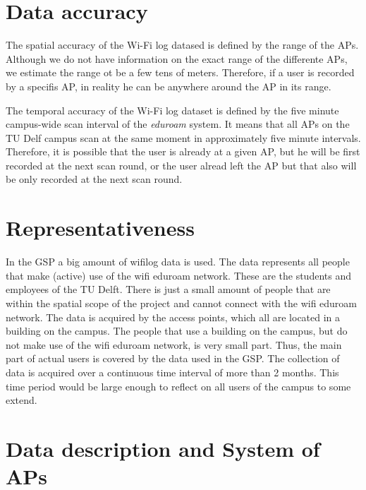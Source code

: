 \section{Data accuracy}
The spatial accuracy of the Wi-Fi log datased is defined by the range of the
APs. Although we do not have information on the exact range of the differente
APs, we estimate the range ot be a few tens of meters. Therefore, if a user is
recorded by a specifis AP, in reality he can be anywhere around the AP in its
range.

The temporal accuracy of the Wi-Fi log dataset is defined by the five minute
campus-wide scan interval of the \textit{eduroam} system. It means that all APs
on the TU Delf campus scan at the same moment in approximately five minute
intervals. Therefore, it is possible that the user is already at a given AP, but
he will be first recorded at the next scan round, or the user alread left the AP
but that also will be only recorded at the next scan round.

\section{Representativeness}
In the GSP a big amount of wifilog data is used. The data represents all people that make (active) use of the wifi eduroam network. These are the students and employees of the TU Delft.  There is just a small amount of people that are within the spatial scope of the project and cannot connect with the wifi eduroam network. The data is acquired by the access points, which all are located in a building on the campus. The people that use a building on the campus, but do not make use of the wifi eduroam network, is very small part. Thus, the main part of actual users is covered by the data used in the GSP. The collection of data is acquired over a continuous time interval of more than 2 months. This time period would be large enough to reflect on all users of the campus to some extend.
\section{Data description and System of APs}\label{datadescriptionandsystemofaps}
